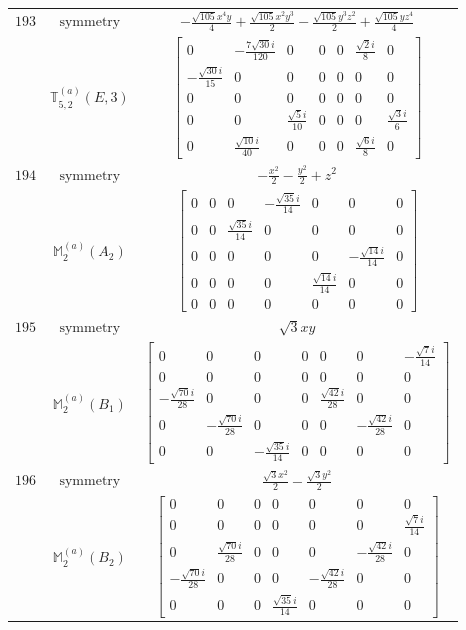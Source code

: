 \documentclass[fleqn,8pt,landscape]{jsarticle}
\begin{document}
\begin{longtable}{ccc}
$ 193 $ & $ \text{symmetry} $ & $ - \frac{\sqrt{105} x^{4} y}{4} + \frac{\sqrt{105} x^{2} y^{3}}{2} - \frac{\sqrt{105} y^{3} z^{2}}{2} + \frac{\sqrt{105} y z^{4}}{4} $ \\
$  $ & $ \mathbb{T}_{5,2}^{(a)}(E,3) $ & $ \begin{bmatrix} 0 & - \frac{7 \sqrt{30} i}{120} & 0 & 0 & 0 & \frac{\sqrt{2} i}{8} & 0 \\ - \frac{\sqrt{30} i}{15} & 0 & 0 & 0 & 0 & 0 & 0 \\ 0 & 0 & 0 & 0 & 0 & 0 & 0 \\ 0 & 0 & \frac{\sqrt{5} i}{10} & 0 & 0 & 0 & \frac{\sqrt{3} i}{6} \\ 0 & \frac{\sqrt{10} i}{40} & 0 & 0 & 0 & \frac{\sqrt{6} i}{8} & 0 \end{bmatrix} $ \\ \hline
$ 194 $ & $ \text{symmetry} $ & $ - \frac{x^{2}}{2} - \frac{y^{2}}{2} + z^{2} $ \\
$  $ & $ \mathbb{M}_{2}^{(a)}(A_{2}) $ & $ \begin{bmatrix} 0 & 0 & 0 & - \frac{\sqrt{35} i}{14} & 0 & 0 & 0 \\ 0 & 0 & \frac{\sqrt{35} i}{14} & 0 & 0 & 0 & 0 \\ 0 & 0 & 0 & 0 & 0 & - \frac{\sqrt{14} i}{14} & 0 \\ 0 & 0 & 0 & 0 & \frac{\sqrt{14} i}{14} & 0 & 0 \\ 0 & 0 & 0 & 0 & 0 & 0 & 0 \end{bmatrix} $ \\ \hline
$ 195 $ & $ \text{symmetry} $ & $ \sqrt{3} x y $ \\
$  $ & $ \mathbb{M}_{2}^{(a)}(B_{1}) $ & $ \begin{bmatrix} 0 & 0 & 0 & 0 & 0 & 0 & - \frac{\sqrt{7} i}{14} \\ 0 & 0 & 0 & 0 & 0 & 0 & 0 \\ - \frac{\sqrt{70} i}{28} & 0 & 0 & 0 & \frac{\sqrt{42} i}{28} & 0 & 0 \\ 0 & - \frac{\sqrt{70} i}{28} & 0 & 0 & 0 & - \frac{\sqrt{42} i}{28} & 0 \\ 0 & 0 & - \frac{\sqrt{35} i}{14} & 0 & 0 & 0 & 0 \end{bmatrix} $ \\ \hline
$ 196 $ & $ \text{symmetry} $ & $ \frac{\sqrt{3} x^{2}}{2} - \frac{\sqrt{3} y^{2}}{2} $ \\
$  $ & $ \mathbb{M}_{2}^{(a)}(B_{2}) $ & $ \begin{bmatrix} 0 & 0 & 0 & 0 & 0 & 0 & 0 \\ 0 & 0 & 0 & 0 & 0 & 0 & \frac{\sqrt{7} i}{14} \\ 0 & \frac{\sqrt{70} i}{28} & 0 & 0 & 0 & - \frac{\sqrt{42} i}{28} & 0 \\ - \frac{\sqrt{70} i}{28} & 0 & 0 & 0 & - \frac{\sqrt{42} i}{28} & 0 & 0 \\ 0 & 0 & 0 & \frac{\sqrt{35} i}{14} & 0 & 0 & 0 \end{bmatrix} $ \\ \hline

\end{longtable}
\end{document}
